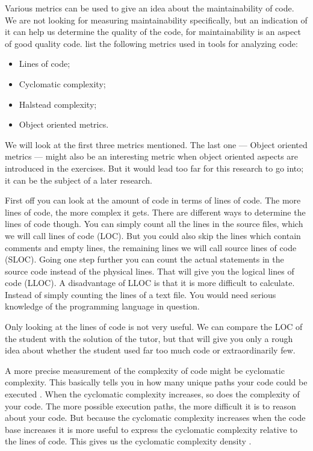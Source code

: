 Various metrics can be used to give an idea about the maintainability of
code. We are not looking for measuring maintainability specifically, but an
indication of it can help us determine the quality of the code, for
maintainability is an aspect of good quality code. \citet{rakic2013problems}
list the following metrics used in tools for analyzing code:
\begin{itemize}
  \item Lines of code;
  \item Cyclomatic complexity;
  \item Halstead complexity;
  \item Object oriented metrics.
\end{itemize}
We will look at the first three metrics mentioned. The last one --- Object
oriented metrics --- might also be an interesting metric when object oriented
aspects are introduced in the exercises. But it would lead too far for this
research to go into; it can be the subject of a later research.

First off you can look at the amount of code in terms of lines of code.
The more lines of code, the more complex it gets. There are different
ways to determine the lines of code though.
You can simply count all the lines in the
source files, which we will call lines of code (LOC). But you could also skip
the lines which contain comments and empty lines, the remaining lines we will
call source lines of code (SLOC). Going one step further you can count the
actual statements in the source code instead of the physical lines. That will
give you the logical lines of code (LLOC). A disadvantage of LLOC is that it is
more difficult to calculate. Instead of simply counting the lines of a text
file. You would need serious knowledge of the programming language in question.

Only looking at the lines of code is not very useful. We can compare the LOC of
the student with the solution of the tutor, but that will give you only a
rough idea about whether the student used far too much code or extraordinarily
few.

A more precise measurement of the complexity of code
might be cyclomatic complexity.
This basically tells you in how many
unique paths your code could be executed \citep{website:js-complexity}. When
the cyclomatic complexity increases, so does the complexity of your code. The
more possible execution paths, the more difficult it is to reason about your
code. But because the cyclomatic complexity increases when the code base
increases it is more useful to express the cyclomatic complexity relative to
the lines of code. This gives us the cyclomatic complexity density
\citep{gill1991cyclomatic}.

